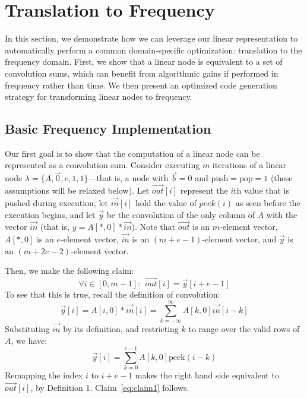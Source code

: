 \section{Translation to Frequency}
\label{sec:freq}

In this section, we demonstrate how we can leverage our linear
representation to automatically perform a common domain-specific
optimization: translation to the frequency domain.  First, we show
that a linear node is equivalent to a set of convolution sums, which
can benefit from algorithmic gains if performed in frequency rather
than time.  We then present an optimized code generation strategy for
transforming linear nodes to frequency.

\subsection{Basic Frequency Implementation}

Our first goal is to show that the computation of a linear node can be
represented as a convolution sum.  Consider executing $m$ iterations
of a linear node $\lambda = \{A, {\vec 0}, e, 1, 1\}$---that is, a
node with $\vec{b} = 0$ and $\mbox{push}=\mbox{pop}=1$ (these assumptions
will be relaxed below).  Let $\vec{out}[i]$ represent the $i$th value
that is pushed during execution, let $\vec{in}[i]$ hold the value of
$peek(i)$ as seen before the execution begins, and let ${\vec y}$ be
the convolution of the only column of $A$ with the vector $\vec{in}$
(that is, $y = A[*,0] * {\vec{in}}$).  Note that $\vec{out}$ is an
$m$-element vector, $A[*,0]$ is an $e$-element vector, ${\vec{in}}$ is
an $(m+e-1)$-element vector, and ${\vec y}$ is an $(m+2e-2)$-element
vector.

Then, we make the following claim:
\begin{equation}
\label{eq:claim1}
\forall i \in [0, m-1]:~~{\vec{out}}[i] = {\vec y}[i+e-1]
\end{equation}
To see that this is true, recall the definition of convolution:
\[
  {\vec y}[i] = A[i,0] * \vec{in}[i] = \sum_{k=-\infty}^{\infty} A[k,0] \vec{in}[i-k]
\]
Substituting $\vec{in}$ by its definition, and restricting $k$ to
range over the valid rows of $A$, we have:
\[
  {\vec y}[i] = \sum_{k=0}^{e-1} A[k,0] \mbox{peek}(i-k)
\]
Remapping the index $i$ to $i+e-1$ makes the right hand side
equivalent to ${\vec{out}}[i]$, by Definition 1.
Claim~\ref{eq:claim1} follows.

